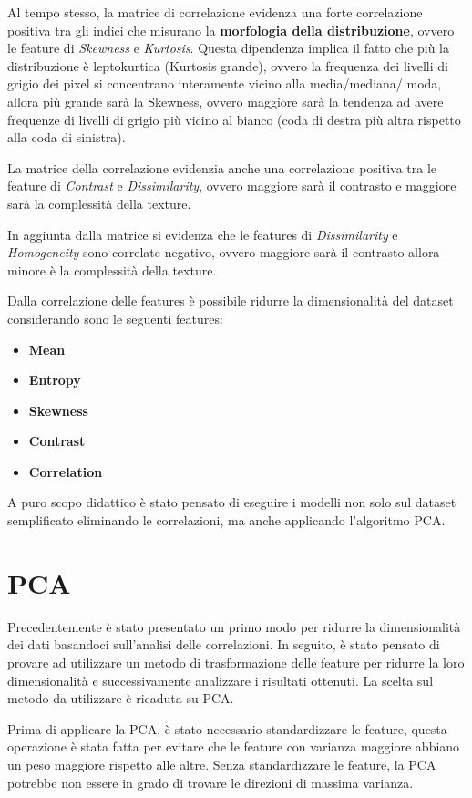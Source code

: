 Al tempo stesso, la matrice di correlazione evidenza una forte correlazione positiva
tra gli indici che misurano la \textbf{morfologia della distribuzione}, ovvero
le feature di \textit{Skewness} e \textit{Kurtosis}. Questa dipendenza implica il
fatto che più la distribuzione è leptokurtica (Kurtosis grande), ovvero la frequenza
dei livelli di grigio dei pixel si concentrano interamente vicino alla media/mediana/
moda, allora più grande sarà la Skewness, ovvero maggiore sarà la tendenza ad avere
frequenze di livelli di grigio più vicino al bianco (coda di destra più altra rispetto
alla coda di sinistra).

La matrice della correlazione evidenzia anche una correlazione positiva tra le
feature di \textit{Contrast} e \textit{Dissimilarity}, ovvero maggiore sarà il
contrasto e maggiore sarà la complessità della texture.

In aggiunta dalla matrice si evidenza che le features di \textit{Dissimilarity}
e \textit{Homogeneity} sono correlate negativo, ovvero maggiore sarà il contrasto
allora minore è la complessità della texture.

Dalla correlazione delle features è possibile ridurre la dimensionalità del dataset
considerando sono le seguenti features:
\begin{itemize}
      \item \textbf{Mean}
      \item \textbf{Entropy}
      \item \textbf{Skewness}
      \item \textbf{Contrast}
      \item \textbf{Correlation}
\end{itemize}
A puro scopo didattico è stato pensato di eseguire i modelli non solo sul dataset
semplificato eliminando le correlazioni, ma anche applicando l'algoritmo PCA.

\section{PCA} \label{sec:pca}
Precedentemente è stato presentato un primo modo per ridurre la dimensionalità
dei dati basandoci sull'analisi delle correlazioni. In seguito, è stato pensato
di provare ad utilizzare un metodo di trasformazione delle feature per ridurre
la loro dimensionalità e successivamente analizzare i risultati ottenuti. La
scelta sul metodo da utilizzare è ricaduta su PCA.

Prima di applicare la PCA, è stato necessario standardizzare le feature, questa
operazione è stata fatta per evitare che le feature con varianza maggiore abbiano
un peso maggiore rispetto alle altre. Senza standardizzare le feature, la PCA
potrebbe non essere in grado di trovare le direzioni di massima varianza.

